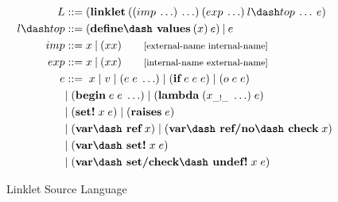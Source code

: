 \begin{figure}[!htbp]
    \centering
    \begin{align*}
        L  &::= (\textbf{linklet}\:((imp\: \ldots)\: \ldots)\:(exp\: \ldots)\:l\dash top\:\ldots\:e)\\
        l\dash top &::= (\textbf{define\dash values}\:(x)\:e)\:|\:e \\
        imp &::= x\:|\:(x x) \qquad\text{\footnotesize [external-name internal-name]}\\
        exp &::= x\:|\:(x x) \qquad\text{\footnotesize [internal-name external-name]}\\
        e &::=\; x\; |\; v\; |\; (e\; e\; \ldots)\; |\; (\textbf{if}\; e\; e\; e)\; |\; (o\; e\; e)\; \\
        \; &|\; (\textbf{begin}\; e\; e\; \ldots)\; |\; (\textbf{lambda}\; (x_{\_!\_}\; \ldots)\; e)\\
        \; &|\; (\textbf{set!}\; x\; e)\; |\; (\textbf{raises}\; e)\\
        \; &|\; (\textbf{var\dash ref}\; x)\; |\; (\textbf{var\dash ref/no\dash check}\; x) \\
        \; &|\; (\textbf{var\dash set!}\; x\; e)  \\
        \; &|\; (\textbf{var\dash set/check\dash undef!}\; x\; e)
	\end{align*}
    \caption{Linklet Source Language}
    \label{fig:linklet-grammar}
\end{figure}